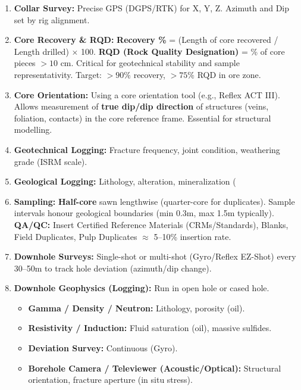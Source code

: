 \documentclass[11pt]{article}
\begin{document}
\begin{methode}
\begin{enumerate}
\item \textbf{Collar Survey:} Precise GPS (DGPS/RTK) for X, Y, Z. Azimuth and Dip set by rig alignment.
\item \textbf{Core Recovery \& RQD:} \textbf{Recovery \%} = (Length of core recovered / Length drilled) $\times$ 100. \textbf{RQD (Rock Quality Designation)} = \% of core pieces $> 10$ cm. Critical for geotechnical stability and sample representativity. Target: $> 90\%$ recovery, $> 75\%$ RQD in ore zone.
\item \textbf{Core Orientation:} Using a core orientation tool (e.g., Reflex ACT III). Allows measurement of \textbf{true dip/dip direction} of structures (veins, foliation, contacts) in the core reference frame. Essential for structural modelling.
\item \textbf{Geotechnical Logging:} Fracture frequency, joint condition, weathering grade (ISRM scale).
\item \textbf{Geological Logging:} Lithology, alteration, mineralization (%
\item \textbf{Sampling:} \textbf{Half-core} sawn lengthwise (quarter-core for duplicates). Sample intervals honour geological boundaries (min 0.3m, max 1.5m typically). \textbf{QA/QC:} Insert Certified Reference Materials (CRMs/Standards), Blanks, Field Duplicates, Pulp Duplicates $\approx$ 5--10\% insertion rate.
\item \textbf{Downhole Surveys:} Single-shot or multi-shot (Gyro/Reflex EZ-Shot) every 30--50m to track hole deviation (azimuth/dip change).
\item \textbf{Downhole Geophysics (Logging):} Run in open hole or cased hole.
    \begin{itemize}
    \item \textbf{Gamma / Density / Neutron:} Lithology, porosity (oil).
    \item \textbf{Resistivity / Induction:} Fluid saturation (oil), massive sulfides.
    \item \textbf{Deviation Survey:} Continuous (Gyro).
    \item \textbf{Borehole Camera / Televiewer (Acoustic/Optical):} Structural orientation, fracture aperture (in situ stress).
    \end{itemize}
\end{enumerate}
\end{methode}
\end{document}
